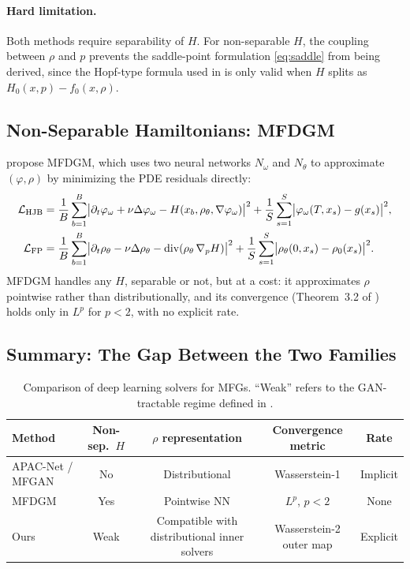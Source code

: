\paragraph{Hard limitation.}
Both methods require separability of $H$.
For non-separable $H$, the coupling between $\rho$ and $p$ prevents
the saddle-point formulation \eqref{eq:saddle} from being derived,
since the Hopf-type formula used in \citet{cao2021connecting}
is only valid when $H$ splits as $H_0(x,p) - f_0(x,\rho)$.

\subsection{Non-Separable Hamiltonians: MFDGM}

\citet{assouline2023deep} propose MFDGM, which uses two neural networks
$N_\omega$ and $N_\theta$ to approximate $(\varphi, \rho)$ by minimizing
the PDE residuals directly:
\begin{align*}
  \mathcal{L}_{\mathrm{HJB}} &= \frac{1}{B}\sum_{b=1}^B
    \bigl|\partial_t\varphi_\omega + \nu\Delta\varphi_\omega
    - H(x_b,\rho_\theta,\nabla\varphi_\omega)\bigr|^2
    + \frac{1}{S}\sum_{s=1}^S
    \bigl|\varphi_\omega(T,x_s) - g(x_s)\bigr|^2,\\
  \mathcal{L}_{\mathrm{FP}} &= \frac{1}{B}\sum_{b=1}^B
    \bigl|\partial_t\rho_\theta - \nu\Delta\rho_\theta
    - \operatorname{div}(\rho_\theta\,\nabla_p H)\bigr|^2
    + \frac{1}{S}\sum_{s=1}^S
    \bigl|\rho_\theta(0,x_s) - \rho_0(x_s)\bigr|^2.
\end{align*}
MFDGM handles any $H$, separable or not, but at a cost:
it approximates $\rho$ pointwise rather than distributionally,
and its convergence (Theorem~3.2 of \citealt{assouline2023deep})
holds only in $L^p$ for $p < 2$, with no explicit rate.

\subsection{Summary: The Gap Between the Two Families}

\begin{table}[h]
\centering
\begin{tabular}{lcccc}
\toprule
Method & Non-sep.\ $H$ & $\rho$ representation & Convergence metric & Rate \\
\midrule
APAC-Net / MFGAN & No  & Distributional & Wasserstein-1 & Implicit \\
MFDGM            & Yes & Pointwise NN   & $L^p$, $p<2$  & None \\
Ours & Weak & Compatible with distributional inner solvers & Wasserstein-2 outer map & Explicit \\
\bottomrule
\end{tabular}
\caption{Comparison of deep learning solvers for MFGs.
``Weak'' refers to the GAN-tractable regime defined in .}
\label{tab:comparison}
\end{table}

